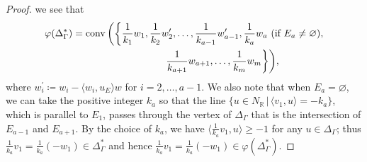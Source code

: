 \documentclass[pdftex]{sigma}%
\numberwithin{equation}{section}
\numberwithin{figure}{section}
\numberwithin{table}{section}
\newcommand{\RR}{\mathbb{R}}
\begin{document}
\begin{proof}
we see that
\begin{gather}
\varphi(\Delta_\Gamma^*)=\operatorname{conv}\bigg(\bigg\{\frac{1}{k_1}w_1,\frac{1}{k_2}w_2^\prime,\dots,\frac{1}{k_{a-1}}w_{a-1}^\prime,
\frac{1}{k_a}w_a \ \text{(if $E_a\neq\varnothing$)}, \nonumber\\
\hphantom{\varphi(\Delta_\Gamma^*)=\operatorname{conv}\bigg(\bigg\{}{}
\frac{1}{k_{a+1}}w_{a+1}, \dots,\frac{1}{k_m}w_m\bigg\}\bigg),\label{generating_set_dual}
\end{gather}
where $w_i^\prime\coloneqq w_i-\langle w_i,u_E\rangle w$ for $i=2,\dots,a-1$.
We also note that when $E_a=\varnothing$, we can take the positive integer $k_a$ so that the line $\{u\in N_\RR\,|\,\langle v_1,u\rangle= -k_a\}$, which is parallel to $E_1$, passes through the vertex of $\Delta_\Gamma$ that is the intersection of $E_{a-1}$ and $E_{a+1}$.
By the choice of $k_a$, we have $\langle \frac{1}{k_a}v_1,u\rangle\ge -1$ for any $u\in \Delta_\Gamma$; thus $\frac{1}{k_a}v_1=\frac{1}{k_a}(-w_1)\in\Delta_\Gamma^*$ and hence $\frac{1}{k_a}v_1=\frac{1}{k_a}(-w_1)\in\varphi(\Delta_\Gamma^*)$.


\end{proof}
\end{document}
